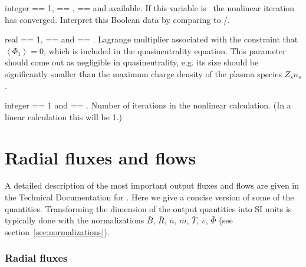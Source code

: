 {integer}
{ == 1,  == \true,  == \true and  available.}
{If this variable is \true~the nonlinear iteration has converged. Interpret this Boolean data by comparing to /.}

\myhrule

{real}
{ == 1,  == \true and  == \true.}
{Lagrange multiplier associated with the constraint that $\left\langle \Phi_1\right\rangle = 0$, which is included in the quasineutrality equation. %
This parameter should come out as negligible in quasineutrality, e.g. its size should be significantly smaller than the maximum charge density of the plasma species $Z_s n_s$.
}

\myhrule

{integer}
{ == 1 and  == \true.}
{Number of iterations in the nonlinear calculation. (In a linear calculation this will be 1.)}

\myhrule



\section{Radial fluxes and flows}

A detailed description of the most important output fluxes and flows are given in the Technical Documentation for \sfincs. 
Here we give a concise version of some of the quantities. 
Transforming the dimension of the output quantities into SI units is typically done with the normalizations 
$\bar{B}$, $\bar{R}$, $\bar{n}$, $\bar{m}$, $\bar{T}$, $\bar{v}$, $\bar{\Phi}$ (see section~\ref{sec:normalizations}). 

\subsubsection{Radial fluxes}

